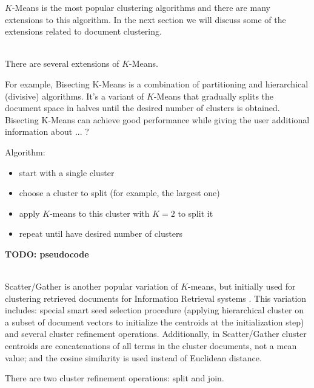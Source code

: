 $K$-Means is the most popular clustering algorithms and there are
many extensions to this algorithm. In the next section we will
discuss some of the extensions related to document clustering.


\ \\

There are several extensions of $K$-Means.


For example, Bisecting K-Means \cite{steinbach2000comparison} is a combination
of partitioning and hierarchical (divisive) algorithms. It's a variant of $K$-Means that
gradually splits the document space in halves until the desired number of clusters
is obtained. Bisecting K-Means can achieve good performance while
giving the user additional information about ... ?

Algorithm:

\begin{itemize}
  \item start with a single cluster
  \item choose a cluster to split (for example, the largest one)
  \item apply $K$-means to this cluster with $K=2$ to split it
  \item repeat until have desired number of clusters
\end{itemize}


\textbf{TODO: pseudocode}


\ \\

Scatter/Gather is another popular variation of $K$-means, but
initially used for clustering retrieved documents for Information
Retrieval systems \cite{cutting1992scatter}. This variation
includes: special smart seed selection procedure (applying
hierarchical cluster on a subset of document vectors to
initialize the centroids at the initialization step) and
several cluster refinement operations.
Additionally, in Scatter/Gather cluster centroids are concatenations
of all terms in the cluster documents, not a mean value;
and the cosine similarity is used instead of Euclidean
distance.


There are two cluster refinement operations: split and join.

